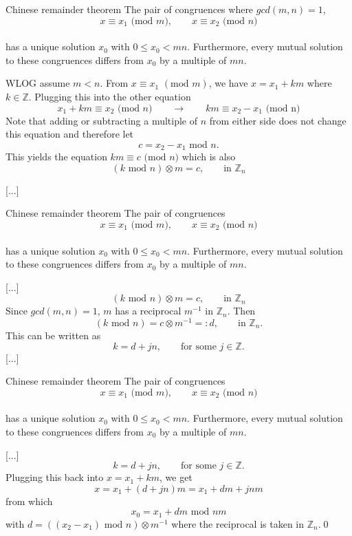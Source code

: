 \documentclass{beamer}
\def\bl[#1]#2{\begin{block}{#1}#2\end{block}}
\begin{document}
\begin{frame}
\bl[Chinese remainder theorem]{
The pair of congruences where $gcd(m,n)=1$,\vspace{-0.3cm}
\[
x\equiv x_1\textrm{ (mod $m$)},\qquad x\equiv x_2 \textrm{ (mod $n$)}
\]\vspace{-0.7cm}\\
has a unique solution $x_0$ with $0\leq x_0<mn$. Furthermore, every mutual solution to these congruences differs from $x_0$ by a multiple of $mn$.
}
WLOG assume $m<n$. From $x\equiv x_1$ $(\textrm{mod } m)$, we have $x=x_1+km$ where $k\in \mathbb{Z}$. Plugging this into the other equation
\[
x_1+km\equiv x_2\textrm{ (mod $n$)}\qquad\to\qquad km\equiv x_2-x_1\textrm{ (mod n)}
\]
Note that adding or subtracting a multiple of $n$ from either side does not change this equation and therefore let 
\[
c=x_2-x_1\textrm{ mod }n.
\]
This yields the equation $km\equiv c\textrm{ (mod $n$)}$ which is also
\[
(k\textrm{ mod } n)\otimes m=c,\qquad\textrm{in $\mathbb{Z}_{n}$}
\]\vspace{-1cm}

[...]
\end{frame}
\begin{frame}
\bl[Chinese remainder theorem]{
The pair of congruences\vspace{-0.3cm}
\[
x\equiv x_1\textrm{ (mod $m$)},\qquad x\equiv x_2 \textrm{ (mod $n$)}
\]\vspace{-0.7cm}\\
has a unique solution $x_0$ with $0\leq x_0<mn$. Furthermore, every mutual solution to these congruences differs from $x_0$ by a multiple of $mn$.
}
[...]
\[
(k\textrm{ mod }n)\otimes m=c,\qquad\textrm{in $\mathbb{Z}_{n}$}
\]
Since $gcd(m,n)=1$, $m$ has a reciprocal $m^{-1}$ in $\mathbb{Z}_n$. Then
\[
(k\textrm{ mod }n)=c\otimes m^{-1}=:d,\qquad\textrm{in $\mathbb{Z}_{n}$}.
\]
This can be written as
\[
k=d+jn,\qquad\textrm{for some $j\in\mathbb{Z}$}.
\]
[...]
\end{frame}

\begin{frame}
\bl[Chinese remainder theorem]{
The pair of congruences\vspace{-0.3cm}
\[
x\equiv x_1\textrm{ (mod $m$)},\qquad x\equiv x_2 \textrm{ (mod $n$)}
\]\vspace{-0.7cm}\\
has a unique solution $x_0$ with $0\leq x_0<mn$. Furthermore, every mutual solution to these congruences differs from $x_0$ by a multiple of $mn$.
}
[...]
\[
k=d+jn,\qquad\textrm{for some $j\in\mathbb{Z}$}.
\]
Plugging this back into $x=x_1+km$, we get
\[
x=x_1+(d+jn)m=x_1+dm+jnm
\]
from which
\[
x_0=x_1+dm\textrm{ mod }nm
\]
with $d=((x_2-x_1)\textrm{ mod } n)\otimes m^{-1}$ where the reciprocal is taken in $\mathbb{Z}_n$.\qed
\end{frame}
\end{document}
